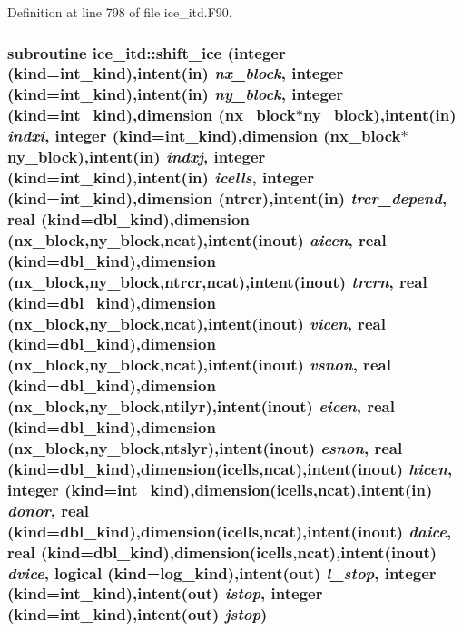Definition at line 798 of file ice\_\-itd.F90.\hypertarget{namespaceice__itd_aa67e5ce0b62a39a084d0058459df445e}{
\subsubsection[{shift\_\-ice}]{\setlength{\rightskip}{0pt plus 5cm}subroutine ice\_\-itd::shift\_\-ice (integer (kind=int\_\-kind),intent(in) {\em nx\_\-block}, \/  integer (kind=int\_\-kind),intent(in) {\em ny\_\-block}, \/  integer (kind=int\_\-kind),dimension (nx\_\-block$\ast$ny\_\-block),intent(in) {\em indxi}, \/  integer (kind=int\_\-kind),dimension (nx\_\-block$\ast$ny\_\-block),intent(in) {\em indxj}, \/  integer (kind=int\_\-kind),intent(in) {\em icells}, \/  integer (kind=int\_\-kind),dimension (ntrcr),intent(in) {\em trcr\_\-depend}, \/  real (kind=dbl\_\-kind),dimension (nx\_\-block,ny\_\-block,ncat),intent(inout) {\em aicen}, \/  real (kind=dbl\_\-kind),dimension (nx\_\-block,ny\_\-block,ntrcr,ncat),intent(inout) {\em trcrn}, \/  real (kind=dbl\_\-kind),dimension (nx\_\-block,ny\_\-block,ncat),intent(inout) {\em vicen}, \/  real (kind=dbl\_\-kind),dimension (nx\_\-block,ny\_\-block,ncat),intent(inout) {\em vsnon}, \/  real (kind=dbl\_\-kind),dimension (nx\_\-block,ny\_\-block,ntilyr),intent(inout) {\em eicen}, \/  real (kind=dbl\_\-kind),dimension (nx\_\-block,ny\_\-block,ntslyr),intent(inout) {\em esnon}, \/  real (kind=dbl\_\-kind),dimension(icells,ncat),intent(inout) {\em hicen}, \/  integer (kind=int\_\-kind),dimension(icells,ncat),intent(in) {\em donor}, \/  real (kind=dbl\_\-kind),dimension(icells,ncat),intent(inout) {\em daice}, \/  real (kind=dbl\_\-kind),dimension(icells,ncat),intent(inout) {\em dvice}, \/  logical (kind=log\_\-kind),intent(out) {\em l\_\-stop}, \/  integer (kind=int\_\-kind),intent(out) {\em istop}, \/  integer (kind=int\_\-kind),intent(out) {\em jstop})}}
\label{namespaceice__itd_aa67e5ce0b62a39a084d0058459df445e}


